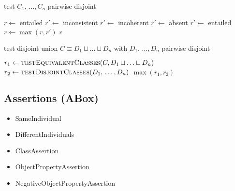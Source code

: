 \documentclass[paper.tex]{subfiles}
\begin{document}

\begin{algorithm}[H]
  \caption{test $C_1, \,\ldots, C_n$ pairwise disjoint}
  \begin{algorithmic}[1]
    \raggedright
      \State $r \gets$ entailed
            \State $r' \gets$ inconsistent
            \State $r' \gets$ incoherent
            \State $r' \gets$ absent
          \Else
            \State $r' \gets$ entailed
          \EndIf
          \State $r \gets \max(r, r')$
        \EndFor
      \EndFor
      \State \Return $r$
    \EndFunction
  \end{algorithmic}
\end{algorithm}

\begin{algorithm}[H]
  \caption{test disjoint union $C \equiv D_1 \sqcup \ldots \sqcup D_n$ with $D_1, \,\ldots, D_n$ pairwise disjoint}
  \begin{algorithmic}[1]
    \raggedright
      \State $r_1 \gets \Call{testEquivalentClasses}{C, D_1 \sqcup \ldots \sqcup D_n}$
      \State $r_2 \gets \Call{testDisjointClasses}{D_1, \,\ldots, D_n}$
      \State \Return $\max(r_1, r_2)$
    \EndFunction
  \end{algorithmic}
\end{algorithm}


\subsection{Assertions (ABox)}

\begin{itemize}[noitemsep]
  \ttfamily
  \item SameIndividual
  \item DifferentIndividuals
  \item ClassAssertion
  \item ObjectPropertyAssertion
  \item NegativeObjectPropertyAssertion
\end{itemize}
\end{document}

